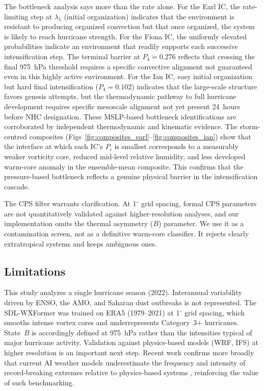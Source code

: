 \documentclass[11pt]{article}
\begin{document}
The bottleneck analysis says more than the rate alone. For the Earl IC,
the rate-limiting step at $\lambda_1$ (initial organization) indicates that the
environment is resistant to producing organized convection but that once organized,
the system is likely to reach hurricane strength. For the Fiona IC, the uniformly elevated probabilities indicate an environment that
readily supports each successive intensification step. The terminal barrier at
$P_4 = 0.276$ reflects that crossing the final 975~hPa threshold requires a specific
convective alignment not guaranteed even in this highly active environment.
For the Ian IC, easy initial organization but hard final intensification ($P_4 = 0.102$)
indicates that the large-scale structure favors genesis attempts, but the thermodynamic
pathway to full hurricane development requires specific mesoscale alignment not yet
present 24~hours before NHC designation.
These MSLP-based bottleneck identifications are corroborated by independent
thermodynamic and kinematic evidence. The storm-centred composites
(Figs~\ref{fig:composites_earl}--\ref{fig:composites_ian}) show that the interface
at which each IC's $P_i$ is smallest corresponds to a measurably weaker vorticity
core, reduced mid-level relative humidity, and less developed warm-core anomaly in
the ensemble-mean composite. This confirms that the pressure-based bottleneck
reflects a genuine physical barrier in the intensification cascade.

The CPS filter warrants clarification. At 1$^\circ$ grid spacing, formal CPS parameters
are not quantitatively validated against higher-resolution analyses, and our implementation
omits the thermal asymmetry ($B$) parameter. We use it as a contamination screen, not
as a definitive warm-core classifier. It rejects clearly extratropical systems and keeps
ambiguous ones.

\subsection{Limitations}

This study analyzes a single hurricane season (2022). Interannual variability driven
by ENSO, the AMO, and Saharan dust outbreaks is not represented. The SDL-WXFormer was
trained on ERA5 (1979--2021) at 1$^\circ$ grid spacing, which smooths intense vortex
cores and underrepresents Category~3+ hurricanes. State~$B$ is accordingly defined at
975~hPa rather than the intensities typical of major hurricane activity. Validation
against physics-based models (WRF, IFS) at higher resolution is an important next step.
Recent work confirms more broadly that current AI weather models underestimate the frequency
and intensity of record-breaking extremes relative to physics-based systems \citep{zhang2026physics},
reinforcing the value of such benchmarking.
\end{document}

